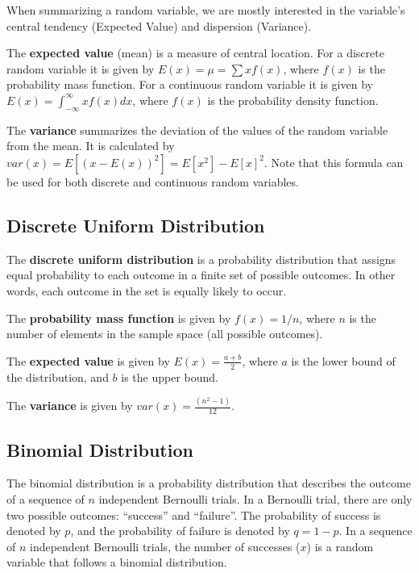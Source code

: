 \documentclass[
  letterpaper,
  DIV=11,
  numbers=noendperiod]{scrreprt}
\begin{document}
When summarizing a random variable, we are mostly interested in the
variable's central tendency (Expected Value) and dispersion (Variance).

The \textbf{expected value} (mean) is a measure of central location. For
a discrete random variable it is given by \(E(x)=\mu=\sum xf(x)\), where
\(f(x)\) is the probability mass function. For a continuous random
variable it is given by \(E(x)= \int_{-\infty}^{\infty} x f(x) dx\),
where \(f(x)\) is the probability density function.

The \textbf{variance} summarizes the deviation of the values of the
random variable from the mean. It is calculated by
\(var(x)=E[(x-E(x))^2]=E[x^2]-E[x]^2\). Note that this formula can be
used for both discrete and continuous random variables.

\hypertarget{discrete-uniform-distribution}{%
\subsection*{Discrete Uniform
Distribution}\label{discrete-uniform-distribution}}

The \textbf{discrete uniform distribution} is a probability distribution
that assigns equal probability to each outcome in a finite set of
possible outcomes. In other words, each outcome in the set is equally
likely to occur.

The \textbf{probability mass function} is given by \(f(x)=1/n\), where
\(n\) is the number of elements in the sample space (all possible
outcomes).

The \textbf{expected value} is given by \(E(x)=\frac {a+b}{2}\), where
\(a\) is the lower bound of the distribution, and \(b\) is the upper
bound.

The \textbf{variance} is given by \(var(x)=\frac {(n^2-1)}{12}\).

\hypertarget{binomial-distribution}{%
\subsection*{Binomial Distribution}\label{binomial-distribution}}

The binomial distribution is a probability distribution that describes
the outcome of a sequence of \(n\) independent Bernoulli trials. In a
Bernoulli trial, there are only two possible outcomes: ``success'' and
``failure''. The probability of success is denoted by \(p\), and the
probability of failure is denoted by \(q = 1 - p\). In a sequence of
\(n\) independent Bernoulli trials, the number of successes (\(x\)) is a
random variable that follows a binomial distribution.
\end{document}
